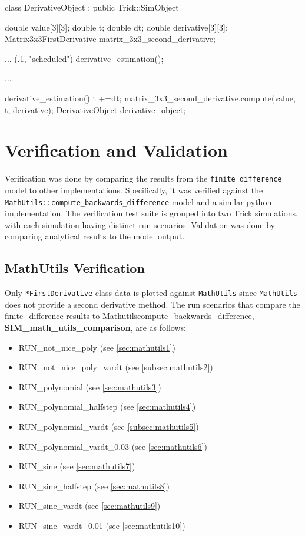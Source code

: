 \documentclass{report}
\begin{document}
\begin{code}
class DerivativeObject : public Trick::SimObject{
    double value[3][3];
    double t; 
    double dt;
    double derivative[3][3];
    Matrix3x3FirstDerivative matrix_3x3_second_derivative;

    ...
        (.1, "scheduled") derivative_estimation();
    
    ...

    derivative_estimation(){
        t +=dt;
        matrix_3x3_second_derivative.compute(value, t, derivative);
    }
    DerivativeObject derivative_object;
}
\end{code}

\chapter{Verification and Validation}
Verification was done by comparing the results from the \verb|finite_difference| model to other implementations. Specifically, it was verified against the \verb|MathUtils::compute_backwards_difference| model and a similar python implementation.
The verification test suite is grouped into two Trick simulations, with each simulation having distinct run scenarios. Validation was done by comparing analytical results to the model output.

\section{MathUtils Verification}
Only \verb|*FirstDerivative| class data is plotted against \verb|MathUtils| since \verb|MathUtils| does not provide a second derivative method. The run scenarios that compare the finite\_difference results to Mathutils\:\:compute\_backwards\_difference, \textbf{SIM\_math\_utils\_comparison}, are as follows:
\begin{itemize}
\item RUN\_not\_nice\_poly (see \ref{sec:mathutils1})
\item RUN\_not\_nice\_poly\_vardt (see \ref{subsec:mathutils2})
\item RUN\_polynomial (see \ref{sec:mathutils3})
\item RUN\_polynomial\_halfstep (see \ref{sec:mathutils4})
\item RUN\_polynomial\_vardt (see \ref{subsec:mathutils5})
\item RUN\_polynomial\_vardt\_0.03 (see \ref{sec:mathutils6})
\item RUN\_sine (see \ref{sec:mathutils7})
\item RUN\_sine\_halfstep (see \ref{sec:mathutils8})
\item RUN\_sine\_vardt (see \ref{sec:mathutils9})
\item RUN\_sine\_vardt\_0.01 (see \ref{sec:mathutils10})
\end{itemize}
\end{document}
